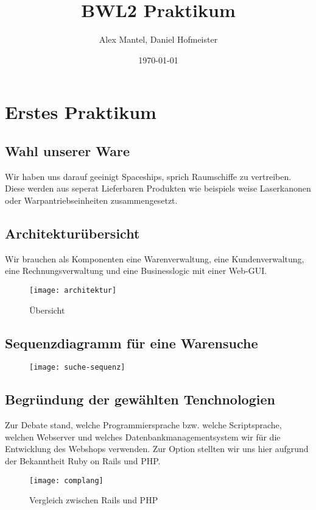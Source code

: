 \documentclass[pdftex,10pt,a4paper]{article}
\begin{document}
\title{BWL2 Praktikum}
\author{Alex Mantel, Daniel Hofmeister}
\date{\today}
\maketitle
\newpage

\tableofcontents
\newpage

\section{Erstes Praktikum}

\subsection{Wahl unserer Ware}
Wir haben uns darauf geeinigt Spaceships, sprich Raumschiffe zu vertreiben. Diese werden aus seperat Lieferbaren Produkten wie beispiels weise Laserkanonen oder Warpantriebseinheiten zusammengesetzt. 

\subsection{Architektur\"ubersicht}
Wir brauchen als Komponenten eine Warenverwaltung, eine Kundenverwaltung, eine Rechnungsverwaltung und eine Businesslogic mit einer Web-GUI.

\begin{figure}[h]
  \caption{\"Ubersicht}
  \label{fig:archi}
  \texttt{[image: architektur]}
\end{figure}

\subsection{Sequenzdiagramm f\"ur eine Warensuche}
\begin{figure}[h]
  \label{fig:suche-seq}
  \texttt{[image: suche-sequenz]}
\end{figure}


\subsection{Begr\"undung der gew\"ahlten Tenchnologien}
Zur Debate stand, welche Programmiersprache bzw. welche Scriptsprache, welchen Webserver und welches Datenbankmanagementsystem wir f\"ur die Entwicklung des Webshops verwenden. Zur Option stellten wir uns hier aufgrund der Bekanntheit Ruby on Rails und PHP.

\begin{figure}[h]
	\caption{Vergleich zwischen Rails und PHP}
	\cite{tbray}
	\label{fig:vergleich}
	\texttt{[image: complang]}
\end{figure}
\end{document}
